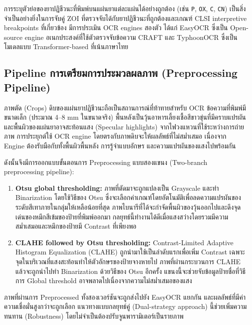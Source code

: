 การระบุตัวย่อของยาปฏิชีวนะที่พิมพ์บนแผ่นยาแต่ละแผ่นได้อย่างถูกต้อง (เช่น \texttt{P}, \texttt{OX}, \texttt{C}, \texttt{CN}) เป็นสิ่งจำเป็นอย่างยิ่งในการจับคู่ ZOI ที่ตรวจจับได้กับยาปฏิชีวนะที่ถูกต้องและเกณฑ์ CLSI interpretive breakpoints ที่เกี่ยวข้อง \cite{clsi2025}
มีการประเมิน OCR engines สองตัว ได้แก่ EasyOCR \cite{baek2019craft,jaidedai2024easyocr} ซึ่งเป็น Open-source engine อเนกประสงค์ที่ใช้ตัวตรวจจับข้อความ CRAFT และ TyphoonOCR \cite{typhoonocr2025} ซึ่งเป็นโมเดลแบบ Transformer-based ที่เน้นภาษาไทย

\subsection{Pipeline การเตรียมการประมวลผลภาพ (Preprocessing Pipeline)}

ภาพตัด (Crops) ดิบของแผ่นยาปฏิชีวนะถือเป็นสถานการณ์ที่ท้าทายสำหรับ OCR ข้อความที่พิมพ์มีขนาดเล็ก (ประมาณ 4--8 mm ในขนาดจริง) พื้นหลังเป็นวุ้นอาหารเลี้ยงเชื้อสีขาวขุ่นที่มีคราบแปรผัน และพื้นผิวของแผ่นยาอาจสะท้อนแสง (Specular highlights) จากไฟวงแหวนที่ใช้ระหว่างการถ่ายภาพ
การประยุกต์ใช้ OCR engine โดยตรงกับภาพดิบจะให้ผลลัพธ์ที่ไม่สม่ำเสมอ เนื่องจาก Engine ต้องรับมือกับทั้งพื้นผิวพื้นหลัง การรู้จำแบบอักษร และความแปรผันของแสงไปพร้อมกัน

ดังนั้นจึงมีการออกแบบขั้นตอนการ Preprocessing แบบสองแขนง (Two-branch preprocessing pipeline):

\begin{enumerate}
  \item \textbf{Otsu global thresholding:}
        ภาพที่ตัดมาจะถูกแปลงเป็น Grayscale และทำ Binarization โดยใช้วิธีของ Otsu \cite{otsu1979} ซึ่งจะเลือกค่าเกณฑ์โดยอัตโนมัติเพื่อลดความแปรผันของระดับสีเทาภายในกลุ่มให้เหลือน้อยที่สุด ภาพไบนารีที่ได้จะกำจัดพื้นผิวของวุ้นออกไปและดึงจุดเด่นของหมึกสีเข้มของป้ายที่พิมพ์ออกมา กลยุทธ์นี้ทำงานได้ดีเมื่อแสงสว่างโดยรวมมีความสม่ำเสมอและหมึกของป้ายมี Contrast ที่เพียงพอ
  \item \textbf{CLAHE followed by Otsu thresholding:}
        Contrast-Limited Adaptive Histogram Equalization (CLAHE) ถูกนำมาใช้เป็นลำดับแรกเพื่อเพิ่ม Contrast เฉพาะจุดในบริเวณที่แสงสะท้อนทำให้ตัวอักษรของป้ายจางหายไป ภาพที่ผ่านกระบวนการ CLAHE แล้วจะถูกนำไปทำ Binarization ด้วยวิธีของ Otsu อีกครั้ง แขนงนี้จะช่วยจับข้อมูลป้ายชื่อที่วิธีการ Global threshold อาจพลาดไปเนื่องจากความไม่สม่ำเสมอของแสง
\end{enumerate}

ภาพที่ผ่านการ Preprocessed ทั้งสองเวอร์ชันจะถูกส่งไปยัง EasyOCR แยกกัน และผลลัพธ์ที่มีค่าความเชื่อมั่นสูงกว่าจะถูกเลือก
แนวทางแบบกลยุทธ์คู่ (Dual-strategy approach) นี้ช่วยเพิ่มความทนทาน (Robustness) โดยไม่จำเป็นต้องปรับจูนพารามิเตอร์เป็นรายภาพ

